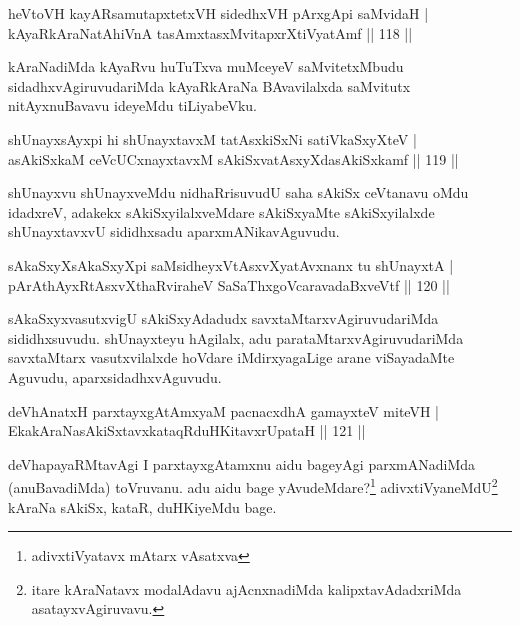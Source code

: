 
\begin{shl}
heVtoVH kayARsamutapxtetxVH sidedhxVH pArxgApi saMvidaH |\\
kAyaRkAraNatAhiVnA tasAmxtasxMvitapxrXtiVyatAmf \hfill || 118 ||
\end{shl}

\begin{artha}%
kAraNadiMda kAyaRvu huTuTxva muMceyeV saMvitetxMbudu sidadhxvAgiruvudariMda kAyaRkAraNa BAvavilalxda saMvitutx nitAyxnuBavavu ideyeMdu tiLiyabeVku.
\end{artha}


\begin{shl}
shUnayxsAyxpi hi shUnayxtavxM tatAsxkiSxNi satiVkaSxyXteV |\\
asAkiSxkaM ceVcUCxnayxtavxM sAkiSxvatAsxyXdasAkiSxkamf \hfill || 119 ||
\end{shl}

\begin{artha}
shUnayxvu shUnayxveMdu nidhaRrisuvudU saha sAkiSx ceVtanavu oMdu idadxreV, adakekx sAkiSxyilalxveMdare sAkiSxyaMte sAkiSxyilalxde shUnayxtavxvU sididhxsadu aparxmANikavAguvudu.
\end{artha}

\begin{shl}
sAkaSxyXsAkaSxyXpi saMsidheyxVtAsxvXyatAvxnanx tu shUnayxtA |\\
pArAthAyxRtAsxvXthaRviraheV SaSaThxgoVcaravadaBxveVtf \hfill || 120 ||
\end{shl}

\begin{artha}
sAkaSxyxvasutxvigU sAkiSxyAdadudx savxtaMtarxvAgiruvudariMda sididhxsuvudu. shUnayxteyu hAgilalx, adu parataMtarxvAgiruvudariMda savxtaMtarx vasutxvilalxde hoVdare iMdirxyagaLige arane viSayadaMte Aguvudu, aparxsidadhxvAguvudu.
\end{artha}

\begin{shl}
deVhAnatxH parxtayxgAtAmx\s yaM pacnacxdhA gamayxteV miteVH |\\
EkakAraNasAkiSxtavxkataqRduHKitavxrUpataH \hfill || 121 ||
\end{shl}

\begin{artha}
deVhapayaRMtavAgi I parxtayxgAtamxnu aidu bageyAgi parxmANadiMda (anuBavadiMda) toVruvanu. adu aidu bage yAvudeMdare?\footnote{adivxtiVyatavx mAtarx vAsatxva} adivxtiVyaneMdU\footnote{itare kAraNatavx modalAdavu ajAcnxnadiMda kalipxtavAdadxriMda asatayxvAgiruvavu.} kAraNa sAkiSx, kataR, duHKiyeMdu bage.
\end{artha}

